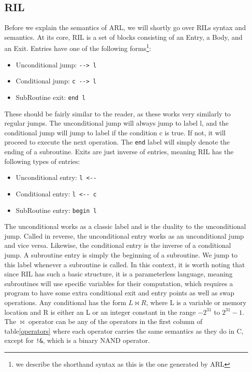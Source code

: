 \documentclass[a4paper]{article}
\begin{document}
\subsection{RIL}
\label{ril}
Before we explain the semantics of ARL, we will shortly go over RILs syntax and semantics\cite{Mogensen2018ReversibleGC}. At its core, RIL is a set of blocks consisting of an Entry, a Body, and an Exit. Entries have one of the following forms\footnote{we describe the shorthand syntax as this is the one generated by ARL}:
\begin{itemize}
\item Unconditional jump: \texttt{-{}-> l}
\item Conditional jump: \texttt{c -{}-> l}
\item SubRoutine exit: \texttt{end l}
\end{itemize}
These should be fairly similar to the reader, as these works very similarly to regular jumps. The unconditional jump will always jump to label l, and the conditional jump will jump to label if the condition c is true. If not, it will proceed to execute the next operation. The \texttt{end} label will simply denote the ending of a subroutine. Exits are just inverse of entries, meaning RIL has the following types of entries:
\begin{itemize}
\item Unconditional entry: \texttt{l <-{}-}
\item Conditional entry: \texttt{l <-{}- c}
\item SubRoutine entry: \texttt{begin l}
\end{itemize}
The unconditional works as a classic label and is the duality to the unconditional jump. Called in reverse, the unconditional entry works as an unconditional jump and vice versa. Likewise, the conditional entry is the inverse of a conditional jump. A subroutine entry is simply the beginning of a subroutine. We jump to this label whenever a subroutine is called.
In this context, it is worth noting that since RIL has such a basic structure, it is a parameterless language, meaning subroutines will use specific variables for their computation, which requires a program to have some extra conditional exit and entry points as well as swap operations. Any conditional has the form \(L \bowtie R\), where L is a variable or memory location and R is either an L or an integer constant in the range \(-2^{31}\) to \(2^{31}-1\). The \(\bowtie\) operator can be any of the operators in the first column of table\ref{operators} where each operator carries the same semantics as they do in C, except for \texttt{!\&}, which is a binary NAND operator.
\end{document}
